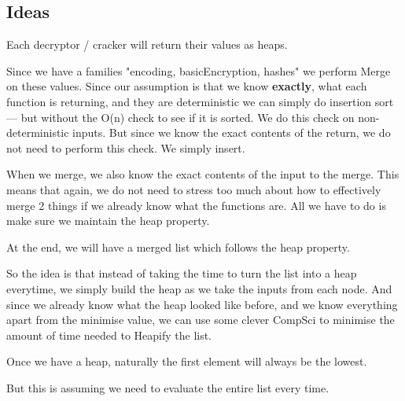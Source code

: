 \documentclass{article}
\theoremstyle{definition}
\begin{document}
\subsection{Ideas}
Each decryptor / cracker will return their values as heaps.

Since we have a families "encoding, basicEncryption, hashes" we perform Merge on these values.
Since our assumption is that we know \textbf{exactly}, what each function is returning, and they are deterministic we can simply do insertion sort --- but without the O(n) check to see if it is sorted. We do this check on non-deterministic inputs. But since we know the exact contents of the return, we do not need to perform this check. We simply insert.

When we merge, we also know the exact contents of the input to the merge. This means that again, we do not need to stress too much about how to effectively merge 2 things if we already know what the functions are. All we have to do is make sure we maintain the heap property.

At the end, we will have a merged list which follows the heap property.

So the idea is that instead of taking the time to turn the list into a heap everytime, we simply build the heap as we take the inputs from each node. And since we already know what the heap looked like before, and we know everything apart from the minimise value, we can use some clever CompSci to minimise the amount of time needed to Heapify the list.

Once we have a heap, naturally the first element will always be the lowest. 

But this is assuming we need to evaluate the entire list every time. 
\end{document}
